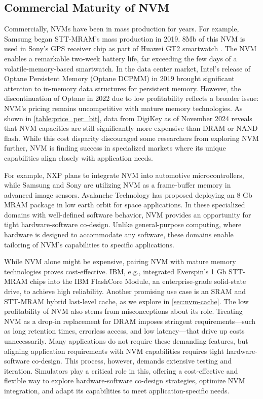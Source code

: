 \documentclass[manuscript,screen]{acmart}
\begin{document}
\subsection{Commercial Maturity of NVM}
\label{sec:commercial_maturity}
Commercially, NVMs have 
been in mass production for years. 
For example, Samsung began STT-MRAM's mass production in 2019.  8Mb of this NVM is used in Sony’s GPS receiver chip as part of Huawei GT2 smartwatch \cite{10145822}.  The NVM enables a remarkable two-week battery life, far exceeding the few days of a volatile-memory-based smartwatch. In the data center market, Intel’s release of Optane Persistent Memory (Optane DCPMM) in 2019 brought significant attention to in-memory data structures for persistent memory. However, the discontinuation of Optane in 2022 due to low profitability reflects a broader issue: NVM’s pricing remains uncompetitive with mature memory technologies. As shown in \cref{table:price_per_bit}, data from DigiKey as of November 2024 \cite{digikey} reveals that NVM capacities are still significantly more expensive than DRAM or NAND flash. While this cost disparity discouraged some researchers from exploring NVM further, NVM is finding success in specialized markets where its unique capabilities align closely with application needs.




For example, NXP plans to integrate NVM into automotive microcontrollers, while Samsung and Sony are utilizing NVM as a frame-buffer memory in advanced image sensors. Avalanche Technology has proposed deploying an 8 Gb MRAM package in low earth orbit for space applications. In these specialized domains with well-defined software behavior, NVM provides an opportunity for tight hardware-software co-design. Unlike general-purpose computing, where hardware is designed to accommodate any software, these domains enable tailoring of NVM’s capabilities to specific applications.

While NVM alone might be expensive, pairing NVM with mature memory technologies proves cost-effective. IBM, e.g., integrated Everspin’s 1 Gb STT-MRAM chips into the IBM FlashCore Module, an enterprise-grade solid-state drive, to achieve high reliability.  Another promising use case is an SRAM and STT-MRAM hybrid last-level cache, as we explore in \cref{sec:nvm-cache}.
The low profitability of NVM also stems from misconceptions about its role. Treating NVM as a drop-in replacement for DRAM imposes stringent requirements—such as long retention times, errorless access, and low latency—that drive up costs unnecessarily. Many applications do not require these demanding features, but aligning application requirements with NVM capabilities requires tight hardware-software co-design. This process, however, demands extensive testing and iteration. Simulators play a critical role in this, offering a cost-effective and flexible way to explore hardware-software co-design strategies, optimize NVM integration, and adapt its capabilities to meet application-specific needs.
\end{document}
